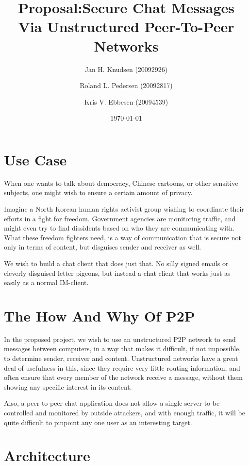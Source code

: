 \documentclass{article}
\begin{document}
\title{Proposal:Secure Chat Messages Via Unstructured Peer-To-Peer Networks}
\date{\today}
\author{Jan H. Knudsen (20092926)
\and
Roland L. Pedersen (20092817)
\and
Kris V. Ebbesen (20094539)
}
\maketitle

\section{Use Case}

When one wants to talk about democracy, Chinese cartoons, or other sensitive subjects, one might wish to ensure a certain amount of privacy.

Imagine a North Korean human rights activist group wishing to coordinate their efforts in a fight for freedom. Government agencies are monitoring traffic, and might even try to find dissidents based on who they are communicating with. What these freedom fighters need, is a way of communication that is secure not only in terms of content, but disguises sender and receiver as well.

We wish to build a chat client that does just that. No silly signed emails or cleverly disguised letter pigeons, but instead a chat client that works just as easily as a normal IM-client.

\section{The How And Why Of P2P}

In the proposed project, we wish to use an unstructured P2P network to send messages between computers, in a way that makes it difficult, if not impossible, to determine sender, receiver and content. Unstructured networks have a great deal of usefulness in this, since they require very little routing information, and often ensure that every member of the network receive a message, without them showing any specific interest in its content.

Also, a peer-to-peer chat application does not allow a single server to be controlled and monitored by outside attackers, and with enough traffic, it will be quite difficult to pinpoint any one user as an interesting target.

\section{Architecture}
\end{document}
